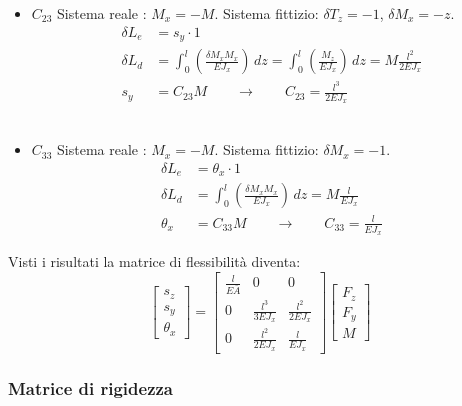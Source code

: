 \begin{itemize}
    \item $C_{23}$
    Sistema reale :  $M_x =-M$. Sistema fittizio: $\delta T_z = -1$, $\delta M_x = -z$. 
    \begin{align*}
        \delta L_e &= s_y \cdot 1 \\
        \delta L_d &= \int_0^l \left(   \frac{\delta M_xM_x}{EJ_x}\right)\,dz 
        =\int_0^l \left(    \frac{M_z}{EJ_x}  \right)\,dz 
        = M\frac{l^2}{2EJ_x}\\
        s_y &= C_{23} M\quad \quad\rightarrow\quad\quad C_{23} =\frac{l^3}{2EJ_x}
    \end{align*}\\
    
    \item $C_{33}$
    Sistema reale :  $M_x =-M$. Sistema fittizio: $\delta M_x = -1$. 
    \begin{align*}
        \delta L_e &= \theta_x \cdot 1 \\
        \delta L_d &= \int_0^l \left(   \frac{\delta M_xM_x}{EJ_x}\right)\,dz 
        = M\frac{l}{EJ_x}\\
        \theta_x &= C_{33} M\quad \quad\rightarrow\quad\quad C_{33} =\frac{l}{EJ_x}
    \end{align*}
    
\end{itemize}

Visti i risultati la matrice di flessibilità diventa:
\begin{equation*}
    \begin{bmatrix}
s_z \\
s_y \\
\theta_x
\end{bmatrix}
=
\begin{bmatrix}
\frac{l}{E\bar{A}} & 0 & 0 \\
0 & \frac{l^3}{3EJ_x} & \frac{l^2}{2EJ_x} \\
0 & \frac{l^2}{2EJ_x} & \frac{l}{EJ_x}
\end{bmatrix}
\begin{bmatrix}
F_z\\
F_y \\
M
\end{bmatrix}
\end{equation*}


\subsubsection*{Matrice di rigidezza}


